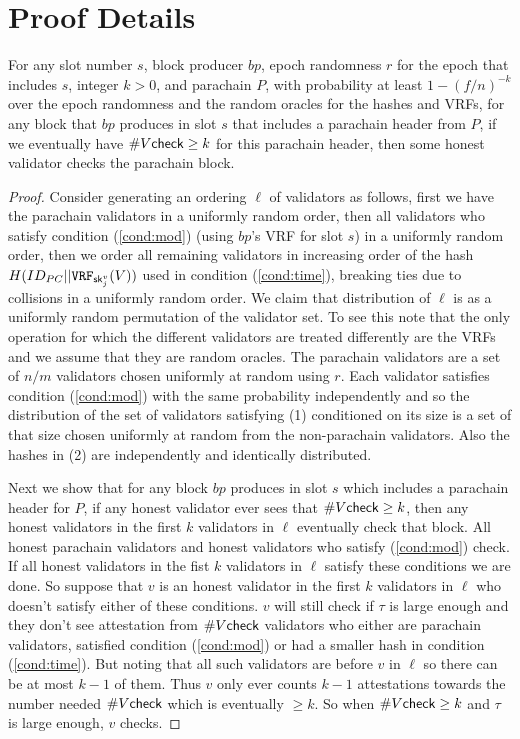 \section{Proof Details}

\begin{lemma}\label{lem:permutation}
For any slot number $s$, block producer $bp$, epoch randomness $r$ for the epoch that includes $s$, integer $k >0$, and parachain $P$, with probability at least $1-(f/n)^{-k}$ over the epoch randomness and the random oracles for the hashes and VRFs, for any block that $bp$ produces in slot $s$ that includes a parachain header from $P$, if we eventually have $\#V\mathsf{check} \geq k$ for this parachain header, then some honest validator checks the parachain block.
\end{lemma}
\begin{proof}
Consider generating an ordering $\ell$ of validators as follows, first we have the parachain validators in a uniformly random order, then all validators who satisfy condition (\ref{cond:mod}) (using $bp$'s VRF for slot $s$) in a uniformly random order, then we order all remaining validators in increasing order of the hash $H(ID_{PC} || \mathtt{VRF}_{\mathsf{sk}^v_j}(V))$ used in condition (\ref{cond:time}), breaking ties due to collisions in a uniformly random order. We claim that distribution of $\ell$ is as a uniformly random permutation of the validator set. To see this note that the only operation for which the different validators are treated differently are the VRFs and we assume that they are random oracles. The parachain validators are a set of $n/m$ validators chosen uniformly at random using $r$. Each validator satisfies condition (\ref{cond:mod}) with the same probability independently and so the distribution of the set of validators satisfying (1) conditioned on its size is a set of that size chosen uniformly at random from the non-parachain validators. Also the hashes in (2) are independently and identically distributed.

Next we show that for any block $bp$ produces in slot $s$ which includes a parachain header for $P$,  if any honest validator ever sees that $\#V\mathsf{check} \geq k$, then any honest validators in the first $k$  validators in $\ell$ eventually check that block. All honest parachain validators and honest validators who satisfy (\ref{cond:mod}) check. If all honest validators in the fist $k$ validators in $\ell$ satisfy these conditions we are done. So suppose that $v$ is an honest validator in the first $k$ validators in $\ell$ who doesn't satisfy either of these conditions. $v$ will still check if $\tau$ is large enough and they don't see attestation from $\#V\mathsf{check}$ validators who either are parachain validators, satisfied condition (\ref{cond:mod})  or had a smaller hash in condition (\ref{cond:time}). But noting that all such validators are before $v$ in $\ell$ so there can be at most $k-1$ of them. Thus $v$ only ever counts $k-1$ attestations towards the number needed $\#V\mathsf{check}$ which is eventually $\geq k$. So when $\#V\mathsf{check} \geq k$ and $\tau$ is large enough, $v$ checks.


\end{proof}
